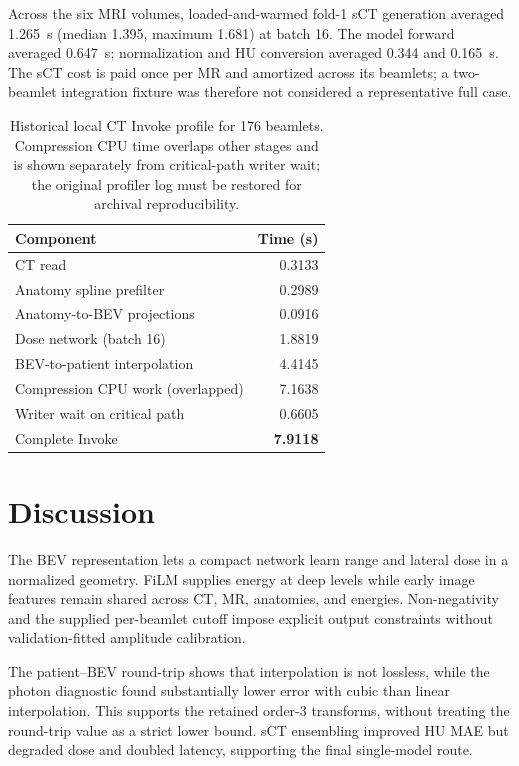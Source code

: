 \documentclass[runningheads]{llncs}
\begin{document}
Across the six MRI volumes, loaded-and-warmed fold-1 sCT generation averaged
1.265~s (median 1.395, maximum 1.681) at batch 16. The model forward averaged
0.647~s; normalization and HU conversion averaged 0.344 and 0.165~s. The sCT
cost is paid once per MR and amortized across its beamlets; a two-beamlet
integration fixture was therefore not considered a representative full case.

\begin{table}[h]
\caption{Historical local CT Invoke profile for 176 beamlets. Compression CPU
time overlaps other stages and is shown separately from critical-path writer
wait; the original profiler log must be restored for archival reproducibility.}
\label{tab:runtime}
\centering
\small
\begin{tabular}{@{}lr@{}}
\toprule
Component & Time (s) \\
\midrule
CT read & 0.3133 \\
Anatomy spline prefilter & 0.2989 \\
Anatomy-to-BEV projections & 0.0916 \\
Dose network (batch 16) & 1.8819 \\
BEV-to-patient interpolation & 4.4145 \\
Compression CPU work (overlapped) & 7.1638 \\
Writer wait on critical path & 0.6605 \\
\midrule
Complete Invoke & \textbf{7.9118} \\
\bottomrule
\end{tabular}
\end{table}

\section{Discussion}

The BEV representation lets a compact network learn range and lateral dose in
a normalized geometry. FiLM supplies energy at deep levels while early image
features remain shared across CT, MR, anatomies, and energies. Non-negativity
and the supplied per-beamlet cutoff impose explicit output constraints without
validation-fitted amplitude calibration.

The patient--BEV round-trip shows that interpolation is not lossless, while
the photon diagnostic found substantially lower error with cubic than linear
interpolation. This supports the retained order-3 transforms, without treating
the round-trip value as a strict lower bound. sCT ensembling improved HU MAE
but degraded dose and doubled latency, supporting the final single-model route.
\end{document}
